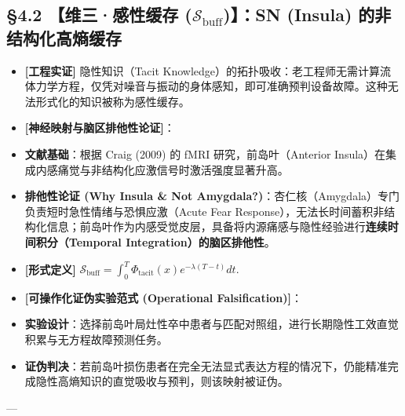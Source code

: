 \documentclass[11pt,a4paper,oneside]{ctexart}
\begin{document}
\subsection{§4.2 【维三·感性缓存 ($\mathcal{S}_{\text{buff}}$)】：SN (Insula) 的非结构化高熵缓存}

\begin{itemize}\item \textbf{[工程实证]} 隐性知识（Tacit Knowledge）的拓扑吸收：老工程师无需计算流体力学方程，仅凭对噪音与振动的身体感知，即可准确预判设备故障。这种无法形式化的知识被称为感性缓存。\end{itemize}
\begin{itemize}\item \textbf{[神经映射与脑区排他性论证]}：\end{itemize}
\begin{itemize}\item \textbf{文献基础}：根据 Craig (2009) 的 fMRI 研究，前岛叶（Anterior Insula）在集成内感痛觉与非结构化应激信号时激活强度显著升高。\end{itemize}
\begin{itemize}\item \textbf{排他性论证 (Why Insula \& Not Amygdala?)}：杏仁核（Amygdala）专门负责短时急性情绪与恐惧应激（Acute Fear Response），无法长时间蓄积非结构化信息；前岛叶作为内感受觉皮层，具备将内源痛感与隐性经验进行\textbf{连续时间积分（Temporal Integration）的脑区排他性}。\end{itemize}
\begin{itemize}\item \textbf{[形式定义]} $\mathcal{S}_{\text{buff}} = \int_{0}^{T} \Phi_{\text{tacit}}(x) e^{-\lambda (T-t)} dt.$\end{itemize}
\begin{itemize}\item \textbf{[可操作化证伪实验范式 (Operational Falsification)]}：\end{itemize}
\begin{itemize}\item \textbf{实验设计}：选择前岛叶局灶性卒中患者与匹配对照组，进行长期隐性工效直觉积累与无方程故障预测任务。\end{itemize}
\begin{itemize}\item \textbf{证伪判决}：若前岛叶损伤患者在完全无法显式表达方程的情况下，仍能精准完成隐性高熵知识的直觉吸收与预判，则该映射被证伪。\end{itemize}

---
\end{document}
